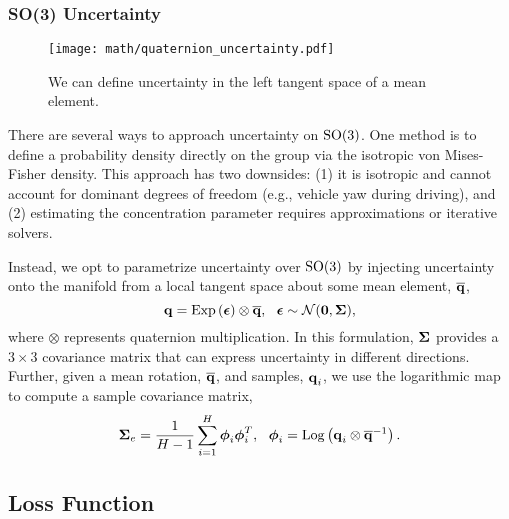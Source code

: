\subsubsection{SO(3) Uncertainty}

\begin{wrapfigure}{r}{0.35\textwidth}
  \vspace{-20pt}
  \begin{center}
	\texttt{[image: math/quaternion\_uncertainty.pdf]}
  \end{center}
    \vspace{-20pt}
	\label{fig:math_quat_uncertainty}
	\caption{We can define uncertainty in the left tangent space of a mean element.}
\end{wrapfigure} 

There are several ways to approach uncertainty on $\mathrm{SO}(3)$. One method \citep{Carlone2015-aq} is to define a probability density directly on the group via the isotropic von Mises-Fisher density. This approach has two downsides: (1) it is isotropic and cannot account for dominant  degrees of freedom (e.g., vehicle yaw during driving), and (2) estimating the concentration parameter requires approximations or iterative solvers.

Instead, we opt to parametrize uncertainty over $\mathrm{SO}(3)$ by injecting uncertainty onto the manifold \citep{Forster2015-af,Barfoot2014-ac,Barfoot2017-ri} from a local tangent space about some mean element, $\overline{\boldsymbol{\mathbf{q}}}$,
\begin{equation}
\label{eq:quat_inject_density}
\boldsymbol{\mathbf{q}} = \mathrm{Exp}\left({\boldsymbol{\mathbf{\epsilon}}}\right) \otimes \overline{\boldsymbol{\mathbf{q}}}, ~~ \boldsymbol{\mathbf{\epsilon}} \sim \mathcal{N}(\boldsymbol{\mathbf{0}}, \boldsymbol{\mathbf{\Sigma}}),
\end{equation}
 \noindent where $\otimes$ represents quaternion multiplication. In this formulation, $\boldsymbol{\mathbf{\Sigma}}$ provides a $3\times 3$ covariance matrix that can express uncertainty in different directions. Further, given a mean rotation, $\overline{\boldsymbol{\mathbf{q}}}$, and samples, $\boldsymbol{\mathbf{q}}_i$, we use the logarithmic map to compute a sample covariance matrix,\begin{equation}
\label{eq:head_covariance}
\boldsymbol{\mathbf{\Sigma}}_e = \frac{1}{H-1} \sum_{i=1}^H  \boldsymbol{\mathbf{\phi}}_i \boldsymbol{\mathbf{\phi}}_i^T, ~~ \boldsymbol{\mathbf{\phi}}_i = \mathrm{Log}\left({\boldsymbol{\mathbf{q}}_i \otimes \overline{\boldsymbol{\mathbf{q}}}^{-1}}\right).
\end{equation}


\subsection{Loss Function}

